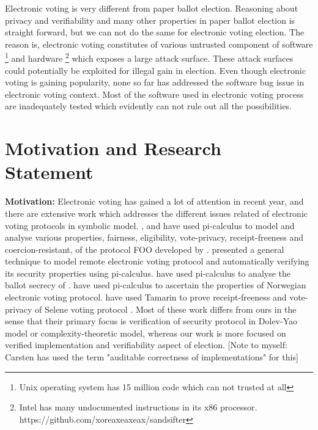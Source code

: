  Electronic voting is very different from paper ballot election. 
 Reasoning 
 about privacy and verifiability and many other properties 
 in paper ballot election 
 is straight forward, but we can not do the same for 
 electronic voting election. The reason is, electronic voting constitutes 
 of various untrusted component of software
 \footnote{Unix operating system has 15 million code which can not 
 trusted at all} and hardware
 \footnote{Intel has many undocumented instructions in its x86 
 processor. https://github.com/xoreaxeaxeax/sandsifter} which 
 exposes a large attack surface. These attack surfaces could 
 potentially be exploited for illegal gain in election. 
 Even though electronic voting is gaining popularity, none so far has 
 addressed the software bug issue in electronic voting context. 
 Most of the software used in electronic voting process are 
 inadequately tested which evidently can not rule out all 
 the possibilities.
  
 \section{Motivation and Research Statement}
 \textbf{Motivation:}
 Electronic voting has gained a lot of attention in recent year,  and  there are extensive work which 
 addresses the different issues related of electronic voting protocols  in symbolic model.
 \cite{10.1007/978-3-540-31987-0_14}, and  \cite{Delaune2010} have used pi-calculus to model 
 and analyse various properties, fairness, eligibility, vote-privacy, receipt-freeness and coercion-resistant,  
 of the protocol FOO developed by \cite{10.1007/3-540-57220-1_66}.  \cite{Backes:2008:AVR:1380848.1381255}
 presented a general technique to model  remote electronic 
 voting protocol and automatically verifying  its security properties using pi-calculus. 
 \cite{5992139} have used pi-calculus to analyse the ballot secrecy of \cite{Helios:2016:HVS}.
 \cite{10.1007/978-3-642-28641-4_7} have used pi-calculus to ascertain the properties of 
 Norwegian electronic voting protocol.
 \cite{10.1007/978-3-319-68687-5_7} have used Tamarin  to prove receipt-freeness 
 and vote-privacy of Selene voting protocol \citep{Selene}.  Most of these work differs from ours
 in the sense that their primary focus is verification of security protocol in  
 Dolev-Yao model or  complexity-theoretic model, whereas our work is 
 more focused on verified implementation and  verifiability  aspect of election.
[Note to myself: Carsten has used the term "auditable correctness of implementations" for this]
 
